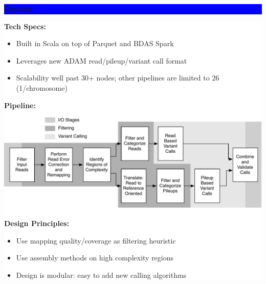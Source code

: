 \documentclass[11pt]{a0poster}
\begin{document}
{\begin{minipage}[t][2045pt][t]{\linewidth}
\begin{minipage}{0.3\linewidth}
\vspace{75pt}
\colorbox{Blue}{
\begin{minipage}{\linewidth}
\vspace{25pt}
\begin{center}
\Huge \bf \color{White} Pipeline
\end{center}
\vspace{10pt}
\end{minipage}
}
\colorbox{White}{
\begin{minipage}[t][1020pt][t]{\linewidth}
\color{Blue}
\vspace{20pt}
\LARGE
\textbf{Tech Specs:}
\begin{itemize}
\item Built in Scala on top of Parquet and BDAS Spark
\item Leverages new ADAM read/pileup/variant call format
\item Scalability well past 30+ nodes; other pipelines are limited to 26 (1/chromosome)
\end{itemize}
\textbf{Pipeline:} \\
\begin{center}
\includegraphics[width=0.9\linewidth]{avocado-architecture.pdf}
\end{center} 
\textbf{Design Principles:}
\begin{itemize}
\item Use mapping quality/coverage as filtering heuristic
\item Use assembly methods on high complexity regions
\item Design is modular: easy to add new calling algorithms
\end{itemize}
\pagebreak
\end{minipage}
}
\pagebreak
\end{minipage}
\begin{minipage}{0.03\linewidth}
\hfill
\pagebreak
\end{minipage}
\begin{minipage}{0.6\linewidth}


\end{minipage}
\end{minipage}}
\end{document}
